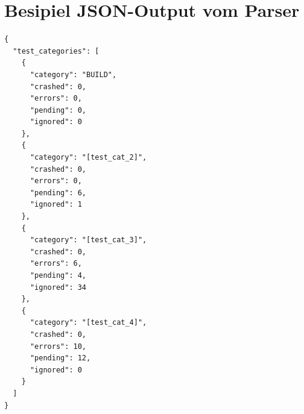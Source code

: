 \newpage
\section{Besipiel JSON-Output vom Parser}
\label{Add:Dashboard:JSON}
\begin{lstlisting}[breaklines]
{
  "test_categories": [
    {
      "category": "BUILD",
      "crashed": 0,
      "errors": 0,
      "pending": 0,
      "ignored": 0
    },
    {
      "category": "[test_cat_2]",
      "crashed": 0,
      "errors": 0,
      "pending": 6,
      "ignored": 1
    },
    {
      "category": "[test_cat_3]",
      "crashed": 0,
      "errors": 6,
      "pending": 4,
      "ignored": 34
    },
    {
      "category": "[test_cat_4]",
      "crashed": 0,
      "errors": 10,
      "pending": 12,
      "ignored": 0
    }
  ]
}
\end{lstlisting}